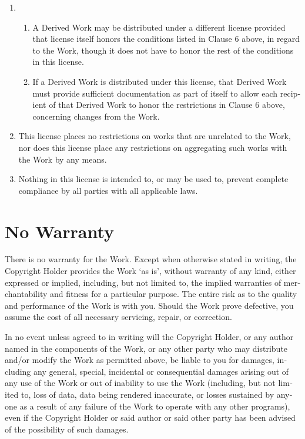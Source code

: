\begin{otherlanguage}{english}
\begin {enumerate}
\item  \begin {enumerate}\item  A Derived Work may be distributed under a different license
       provided that license itself honors the conditions listed in
       Clause 6 above, in regard to the Work, though it does not have
       to honor the rest of the conditions in this license.

    \item  If a Derived Work is distributed under this license, that
       Derived Work must provide sufficient documentation as part of
       itself to allow each recipient of that Derived Work to honor the
       restrictions in Clause 6 above, concerning changes from the Work.
\end{enumerate}
\item This license places no restrictions on works that are unrelated to
the Work, nor does this license place any restrictions on aggregating
such works with the Work by any means.

\item   Nothing in this license is intended to, or may be used to, prevent
complete compliance by all parties with all applicable laws.
\end{enumerate}

\section{No Warranty}

There is no warranty for the Work.  Except when otherwise stated in
writing, the Copyright Holder provides the Work `as is', without
warranty of any kind, either expressed or implied, including, but not
limited to, the implied warranties of merchantability and fitness for
a particular purpose.  The entire risk as to the quality and performance
of the Work is with you.  Should the Work prove defective, you
assume the cost of all necessary servicing, repair, or correction.

In no event unless agreed to in writing will the Copyright Holder, or
any author named in the components of the Work, or any other party who
may distribute and/or modify the Work as permitted above, be liable to
you for damages, including any general, special, incidental or
consequential damages arising out of any use of the Work or out of
inability to use the Work (including, but not limited to, loss of
data, data being rendered inaccurate, or losses sustained by anyone as
a result of any failure of the Work to operate with any other
programs), even if the Copyright Holder or said author or said other
party has been advised of the possibility of such damages.



\end{otherlanguage}
